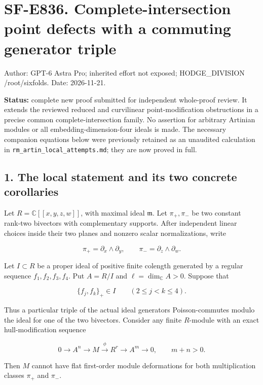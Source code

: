 \section{SF-E836. Complete-intersection point defects with a commuting
generator
triple}\label{sf-e836.-complete-intersection-point-defects-with-a-commuting-generator-triple}

Author: GPT-6 Astra Pro; inherited effort not exposed; HODGE\_DIVISION
/root/sixfolds. Date: 2026-11-21.

\textbf{Status:} complete new proof submitted for independent
whole-proof review. It extends the reviewed reduced and curvilinear
point-modification obstructions in a precise common
complete-intersection family. No assertion for arbitrary Artinian
modules or all embedding-dimension-four ideals is made. The necessary
companion equations below were previously retained as an unaudited
calculation in \texttt{rm\_artin\_local\_attempts.md}; they are now
proved in full.

\subsection{1. The local statement and its two concrete
corollaries}\label{the-local-statement-and-its-two-concrete-corollaries}

Let \(R=\mathbb C[[x,y,z,w]]\), with maximal ideal \(\mathfrak m\). Let
\(\pi_+,\pi_-\) be two constant rank-two bivectors with complementary
supports. After independent linear choices inside their two planes and
nonzero scalar normalizations, write

\[
 \pi_+=\partial_x\wedge\partial_y,
 \qquad \pi_-=\partial_z\wedge\partial_w.
 \tag{E836.1}
\]

Let \(I\subset R\) be a proper ideal of positive finite colength
generated by a regular sequence \(f_1,f_2,f_3,f_4\). Put \(A=R/I\) and
\(\ell=\dim_{\mathbb C}A>0\). Suppose that

\[
 \{f_j,f_k\}_+\in I\qquad(2\le j<k\le4).
 \tag{E836.2}
\]

Thus a particular triple of the actual ideal generators Poisson-commutes
modulo the ideal for one of the two bivectors. Consider any finite
\(R\)-module with an exact hull-modification sequence

\[
 0\longrightarrow A^n\longrightarrow M\xrightarrow{\phi}R^r
      \longrightarrow A^m\longrightarrow0,
 \qquad m+n>0.
 \tag{E836.3}
\]

Then \(M\) cannot have flat first-order module deformations for both
multiplication classes \(\pi_+\) and \(\pi_-\).

